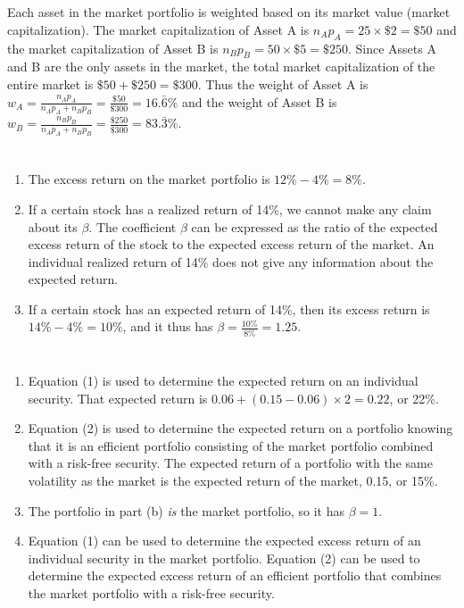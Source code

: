 \documentclass[12pt]{article}
\begin{document}
\section{}
Each asset in the market portfolio is weighted based on its market value (market capitalization). The market capitalization of Asset A is $n_Ap_A=25\times\$2=\$50$ and the market capitalization of Asset B is $n_Bp_B=50\times\$5=\$250$. Since Assets A and B are the only assets in the market, the total market capitalization of the entire market is $\$50+\$250=\$300$. Thus the weight of Asset A is $w_A=\frac{n_Ap_A}{n_Ap_A+n_Bp_B}=\frac{\$50}{\$300}=16.\bar{6}\%$ and the weight of Asset B is $w_B=\frac{n_Bp_B}{n_Ap_A+n_Bp_B}=\frac{\$250}{\$300}=83.\bar{3}\%$.
\section{}
\begin{enumerate}
    \item The excess return on the market portfolio is $12\%-4\%=8\%$. 
    \item If a certain stock has a realized return of 14\%, we cannot make any claim about its $\beta$. The coefficient $\beta$ can be expressed as the ratio of the expected excess return of the stock to the expected excess return of the market. An individual realized return of 14\% does not give any information about the expected return. 
    \item If a certain stock has an expected return of 14\%, then its excess return is $14\%-4\%=10\%$, and it thus has $\beta=\frac{10\%}{8\%}=1.25$.
\end{enumerate}
\section{}
\begin{enumerate}
    \item Equation (1) is used to determine the expected return on an individual security. That expected return is $0.06+(0.15-0.06)\times 2=0.22$, or 22\%.
    \item Equation (2) is used to determine the expected return on a portfolio knowing that it is an efficient portfolio consisting of the market portfolio combined with a risk-free security. The expected return of a portfolio with the same volatility as the market is the expected return of the market, 0.15, or 15\%.
    \item The portfolio in part (b) \textit{is} the market portfolio, so it has $\beta=1$.
    \item Equation (1) can be used to determine the expected excess return of an individual security in the market portfolio. Equation (2) can be used to determine the expected excess return of an efficient portfolio that combines the market portfolio with a risk-free security.
\end{enumerate}
\end{document}
